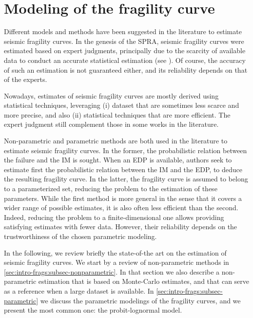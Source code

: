 







\section{Modeling of the fragility curve}\label{sec:intro-frags:models}

Different models and methods have been suggested in the literature to estimate seismic fragility curves.
In the genesis of the SPRA, seismic fragility curves were estimated based on expert judgments, principally due to the scarcity of available data to conduct an accurate statistical estimation (see \cite{kennedy_probabilistic_1980}).
Of course, the accuracy of such an estimation is not guaranteed either, and its reliability depends on that of the experts.

Nowadays, estimates of seismic fragility curves are mostly derived using statistical techniques, leveraging (i) dataset that are sometimes less scarce and more precise, and also (ii) statistical techniques that are more efficient. 
The expert judgment still complement those in some works in the literature.


Non-parametric and parametric methods are both used in the literature to estimate seismic fragility curves.
In the former, the probabilistic relation between the failure and the IM is sought. When an EDP is available, authors seek to estimate first the probabilistic relation between the IM and the EDP, to deduce the resulting fragility curve.
In the latter, the fragility curve is assumed to belong to a parameterized set, reducing the problem to the estimation of these parameters.
While the first method is more general in the sense that it covers a wider range of possible estimates, it is also often less efficient than the second. Indeed, reducing the problem to a finite-dimensional one allows providing satisfying estimates with fewer data. However, their reliability depends on the trustworthiness of the chosen parametric modeling.

In the following, we review briefly the
state-of-the art on the estimation of seismic fragility curves. We start by a review of non-parametric methods in \cref{sec:intro-frags:subsec-nonparametric}. In that section we also describe a non-parametric estimation that is based on Monte-Carlo estimates, and that can serve as a reference when a large dataset is available.
In \cref{sec:intro-frags:subsec-parametric} we discuss the parametric modelings of the fragility curves, and we present the most common one: the probit-lognormal model.



